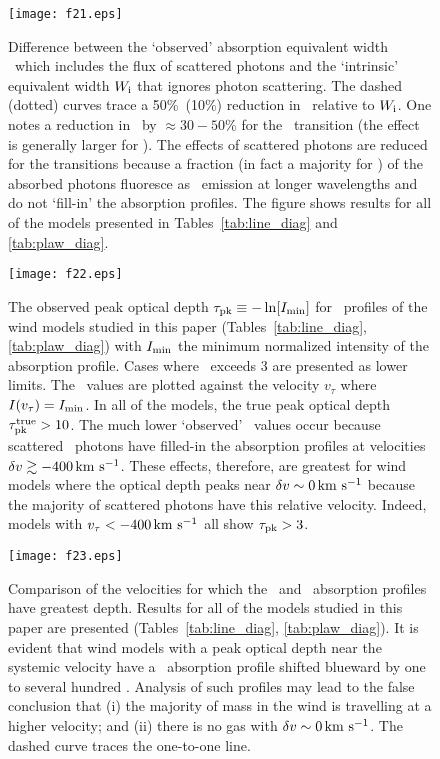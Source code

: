 \documentclass[12pt,preprint]{aastex}
\begin{document}
\begin{figure}
\texttt{[image: f21.eps]}
\caption{
Difference between the `observed' absorption equivalent width \ewabs\
which includes the flux of scattered photons and the `intrinsic'
equivalent width $W_{\rm i}$ that ignores photon scattering.  The
dashed (dotted) curves trace a 50\%\ (10\%) reduction in \ewabs\
relative to $W_{\rm i}$.  One notes a reduction in \ewabs\ by $\approx
30-50\%$ for the \mgiia\ transition (the effect is generally larger
for \mgiib).  The effects of scattered photons are reduced for the
\ion{Fe}{2} transitions because a fraction (in fact a majority for
\feiia) of the absorbed photons fluoresce as \feiis\ emission at
longer wavelengths and do not `fill-in' the absorption profiles.
The figure shows results for all of the models presented in
Tables~\ref{tab:line_diag} and \ref{tab:plaw_diag}.
}
\label{fig:obs_ew}
\end{figure}

\begin{figure}
\texttt{[image: f22.eps]}
\caption{
The observed peak optical depth $\tau_{\rm pk} \equiv -\ln [I_{\rm
  min}]$ for \mgiia\ profiles of the wind models studied in this paper
(Tables~\ref{tab:line_diag}, \ref{tab:plaw_diag}) with $I_{\rm min}$
the minimum normalized intensity of the absorption profile.  Cases
where \tpk\ exceeds 3 are presented as lower limits.  The \tpk\ values
are plotted against the velocity $v_\tau$ where $I(v_\tau) = I_{\rm min}$.  In all
of the models, the true peak optical depth $\tau_{\rm pk}^{\rm true} > 10$.
The much lower `observed' \tpk\ values occur because scattered \mgiia\
photons have filled-in the absorption profiles at velocities $\delta v
\gtrsim -400 \, {\rm km~s^{-1}}$. These effects, therefore, are greatest for wind
models where the optical depth peaks near $\delta v \sim 0 \, {\rm km~s^{-1}}$ because
the majority of scattered photons have this relative velocity.
Indeed, models with $v_\tau < -400 \, {\rm km~s^{-1}}$ all show $\tau_{\rm pk} > 3$.
}
\label{fig:obs_peaktau}
\end{figure}

\begin{figure}
\texttt{[image: f23.eps]}
\caption{
Comparison of the velocities for which the \feiia\ and \mgiia\ absorption
profiles have greatest depth.  Results for all of the models
studied in this paper are presented (Tables~\ref{tab:line_diag},
\ref{tab:plaw_diag}).  
It is evident that wind models with a peak optical depth near the
systemic velocity have a \mgiia\ absorption profile shifted blueward
by one to several hundred \kms.  Analysis of such profiles may lead to
the false conclusion 
that (i) the majority of mass in the wind is travelling at a higher
velocity; and (ii) there is no gas with $\delta v \sim 0 \, {\rm km~s^{-1}}$.
The dashed curve traces the one-to-one line.
}
\label{fig:obs_vtau}
\end{figure}
\end{document}
